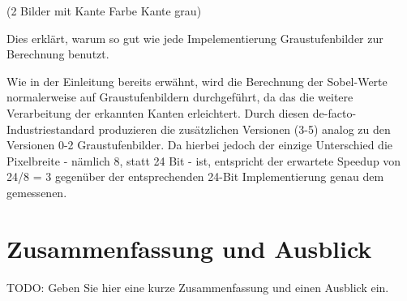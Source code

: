 \documentclass[course=erap]{aspdoc}
\begin{document}
(2 Bilder mit Kante Farbe Kante grau)

Dies erklärt, warum so gut wie jede Impelementierung Graustufenbilder zur Berechnung benutzt.

Wie in der Einleitung bereits erwähnt, wird die Berechnung der Sobel-Werte normalerweise auf Graustufenbildern durchgeführt, da das die weitere Verarbeitung der erkannten Kanten erleichtert.
Durch diesen de-facto-Industriestandard produzieren die zusätzlichen Versionen (3-5) analog zu den Versionen 0-2 Graustufenbilder.
Da hierbei jedoch der einzige Unterschied die Pixelbreite - nämlich 8, statt 24 Bit - ist, entspricht der erwartete Speedup von 24/8 = 3 gegenüber der entsprechenden 24-Bit Implementierung genau dem gemessenen.
\section{Zusammenfassung und Ausblick}
TODO: Geben Sie hier eine kurze Zusammenfassung und einen Ausblick ein.


\end{document}
